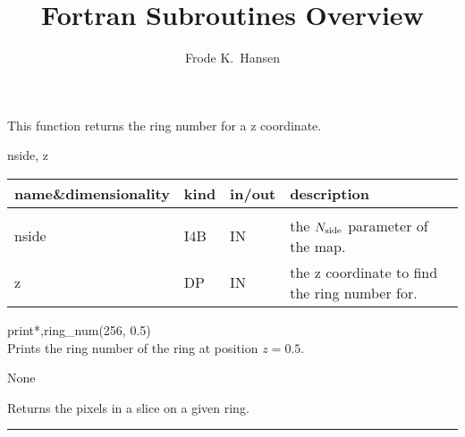 

\sloppy

\title{\healpix Fortran Subroutines Overview}
 \section[ring\_num]{ }
\label{sub:ring_num}
\author{Frode K.~Hansen}


\begin{facility}
{This function returns the ring number for a z coordinate.}
{\modPixTools}
\end{facility}

\begin{f90function}
{nside, z}
\end{f90function}

\begin{arguments}
{
\begin{tabular}{p{0.4\hsize} p{0.05\hsize} p{0.1\hsize} p{0.35\hsize}} \hline  
\textbf{name\&dimensionality} & \textbf{kind} & \textbf{in/out} & \textbf{description} \\ \hline
                   &   &   &                           \\ %
nside & I4B & IN & the ${N_{\rm side}}$ parameter of the map. \\
z & DP & IN & the z coordinate to find the ring number for. \\

\end{tabular}
}
\end{arguments}

\begin{example}
{
print*,ring\_num(256, 0.5)  \\
}
{
Prints the ring number of the ring at position $z=0.5$.
}
\end{example}

\begin{modules}
  \begin{sulist}{} %
 \item[None]	
  \end{sulist}
\end{modules}
\newpage
\begin{related}
  \begin{sulist}{} %
 \item[\htmlref{in\_ring}{sub:in_ring}] Returns the pixels in a slice on a given ring.
  \end{sulist}
\end{related}

\rule{\hsize}{2mm}

\newpage
